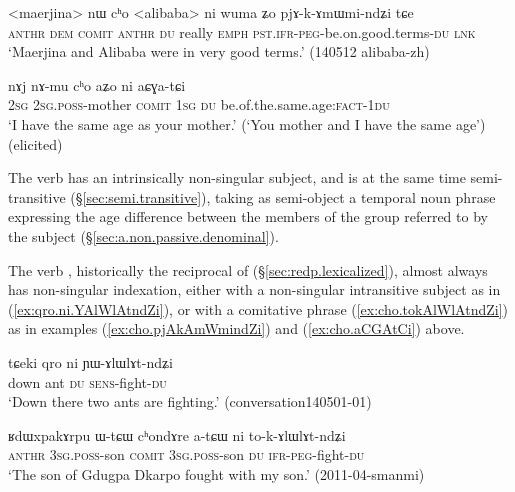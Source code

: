\begin{exe}
\ex   \label{ex:cho.pjAkAmWmindZi}
 \gll  <maerjina> nɯ cʰo <alibaba> ni wuma ʑo pjɤ-k-ɤmɯmi-ndʑi tɕe \\
\textsc{anthr} \textsc{dem} \textsc{comit}  \textsc{anthr} \textsc{du} really \textsc{emph} \textsc{pst}.\textsc{ifr}-\textsc{peg}-be.on.good.terms-\textsc{du} \textsc{lnk} \\
\glt `Maerjina and Alibaba were in very good terms.' (140512 alibaba-zh)
\end{exe}

\begin{exe}
\ex   \label{ex:cho.aCGAtCi}
 \gll  nɤj nɤ-mu cʰo aʑo ni aɕɣa-tɕi \\
 \textsc{2sg} \textsc{2sg}.\textsc{poss}-mother \textsc{comit} \textsc{1sg} \textsc{du} be.of.the.same.age:\textsc{fact}-\textsc{1du} \\
 \glt `I have the same age as your mother.' (`You mother and I have the same age') (elicited)
\end{exe} 

The verb  has an intrinsically non-singular subject, and is at the same time semi-transitive (§\ref{sec:semi.transitive}), taking as semi-object a temporal noun phrase expressing the age difference between the members of the group referred to by the subject (§\ref{sec:a.non.passive.denominal}).
 
The verb , historically the reciprocal of  (§\ref{sec:redp.lexicalized}), almost always has non-singular indexation, either with a non-singular intransitive subject as in (\ref{ex:qro.ni.YAlWlAtndZi}), or with a comitative phrase (\ref{ex:cho.tokAlWlAtndZi}) as in examples (\ref{ex:cho.pjAkAmWmindZi}) and (\ref{ex:cho.aCGAtCi}) above.

\begin{exe}
\ex   \label{ex:qro.ni.YAlWlAtndZi}
 \gll  tɕeki qro ni ɲɯ-ɤlɯlɤt-ndʑi \\
 down ant \textsc{du} \textsc{sens}-fight-\textsc{du} \\
\glt `Down there two ants are fighting.' (conversation140501-01)
\end{exe}

\begin{exe}
	\ex   \label{ex:cho.tokAlWlAtndZi}
	\gll ʁdɯxpakɤrpu ɯ-tɕɯ cʰondɤre a-tɕɯ ni to-k-ɤlɯlɤt-ndʑi \\
	\textsc{anthr} \textsc{3sg}.\textsc{poss}-son \textsc{comit}  \textsc{3sg}.\textsc{poss}-son \textsc{du} \textsc{ifr}-\textsc{peg}-fight-\textsc{du} \\
	\glt `The son of Gdugpa Dkarpo fought with my son.' (2011-04-smanmi)
\end{exe}


